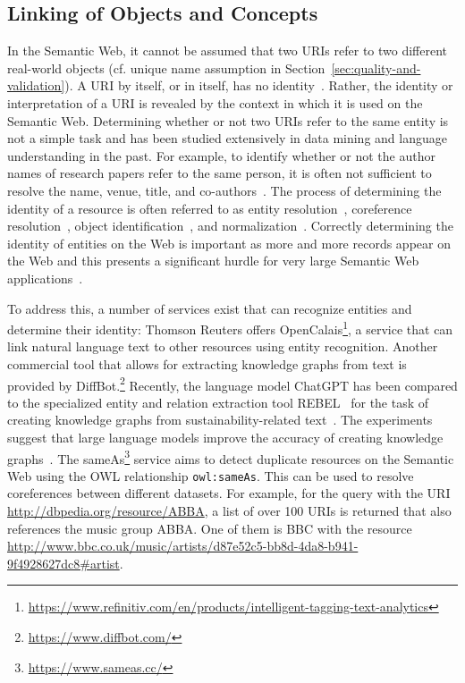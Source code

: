 \documentclass[a4paper,USenglish]{tgdk-v2021}
\newcommand{\concept}[1]{\texttt{#1}}
\newcommand{\myurl}[1]{\footnote{\url{#1}}}
\begin{document}
\subsection{Linking of Objects and Concepts}
\label{sec:identity}

In the Semantic Web, it cannot be assumed that two URIs refer to two different real-world objects (cf. unique name assumption in Section~\ref{sec:quality-and-validation}).
A URI by itself, or in itself, has no identity~\cite{HalpinP09}.
Rather, the identity or interpretation of a URI is revealed by the context in which it is used on the Semantic Web.
Determining whether or not two URIs refer to the same entity is not a simple task and has been studied extensively in data mining and language understanding in the past.
For example, to identify whether or not the author names of research papers refer to the same person, it is often not sufficient to resolve the name, venue, title, and co-authors~\cite{PallikaEtAlCoreference2007}.
The process of determining the identity of a resource is often referred to as entity resolution~\cite{PallikaEtAlCoreference2007}, coreference resolution~\cite{WickEtAlCoreference}, object identification~\cite{RendleS06}, and normalization~\cite{WickEtAlCoreference,WickKDD2008}.
Correctly determining the identity of entities on the Web is important as more and more records appear on the Web and this presents a significant hurdle for very large Semantic Web applications~\cite{GlaserLOD2009}.

To address this, a number of services exist that can recognize entities and determine their identity:
Thomson Reuters offers OpenCalais\myurl{https://www.refinitiv.com/en/products/intelligent-tagging-text-analytics}, a service that can link natural language text to other resources using entity recognition. 
Another commercial tool that allows for extracting knowledge graphs from text is provided by DiffBot.\myurl{https://www.diffbot.com/}
Recently, the language model ChatGPT has been compared to the specialized entity and relation extraction tool REBEL~\cite{DBLP:conf/emnlp/CabotN21} for the task of creating knowledge graphs from sustainability-related text~\cite{DBLP:journals/corr/abs-2305-04676}.
The experiments suggest that large language models improve the accuracy of creating knowledge graphs~\cite{DBLP:journals/corr/abs-2305-04676}.
The sameAs\myurl{https://www.sameas.cc/} service aims to detect duplicate resources on the Semantic Web using the OWL relationship \concept{owl:sameAs}.
This can be used to resolve coreferences between different datasets.
For example, for the query with the URI \url{http://dbpedia.org/resource/ABBA}, a list of over 100 URIs is returned that also references the music group ABBA.
One of them is BBC with the resource \url{http://www.bbc.co.uk/music/artists/d87e52c5-bb8d-4da8-b941-9f4928627dc8#artist}.
\end{document}
